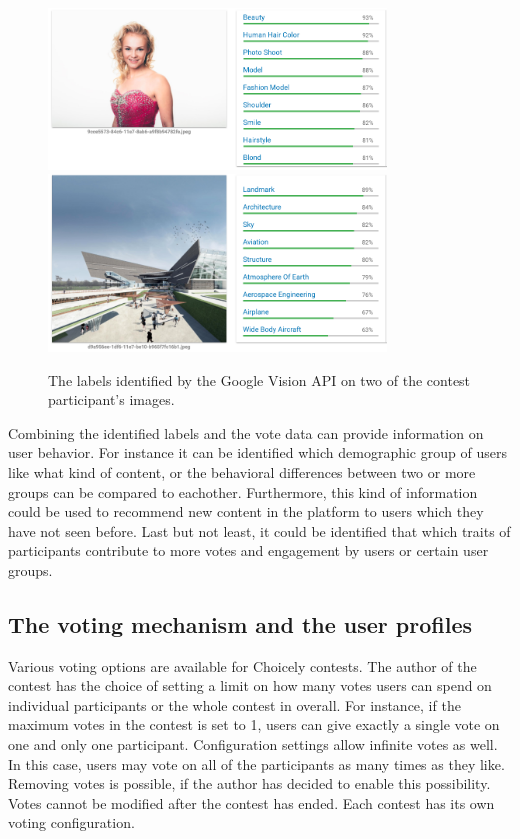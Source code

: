     \begin{figure}[h] 
		\begin{center}
            \includegraphics[width=0.8\textwidth]{images/google_vision_labels.png}
            \includegraphics[width=0.8\textwidth]{images/google_vision_labels2.png}
			\caption{The labels identified by the Google Vision API on two of the contest participant's images.}
			\label{google_vision_labels}
		\end{center}
    \end{figure}

    Combining the identified labels and the vote data can provide information on user behavior. For instance it can be identified which demographic group of users like what kind of content, or the behavioral differences between two or more groups can be compared to eachother. Furthermore, this kind of information could be used to recommend new content in the platform to users which they have not seen before. Last but not least, it could be identified that which traits of participants contribute to more votes and engagement by users or certain user groups.  

\subsection{The voting mechanism and the user profiles}
Various voting options are available for Choicely contests. The author of the contest has the choice of setting a limit on how many votes users can spend on individual participants or the whole contest in overall. For instance, if the maximum votes in the contest is set to 1, users can give exactly a single vote on one and only one participant. Configuration settings allow infinite votes as well. In this case, users may vote on all of the participants as many times as they like. Removing votes is possible, if the author has decided to enable this possibility. Votes cannot be modified after the contest has ended. Each contest has its own voting configuration. 
    
